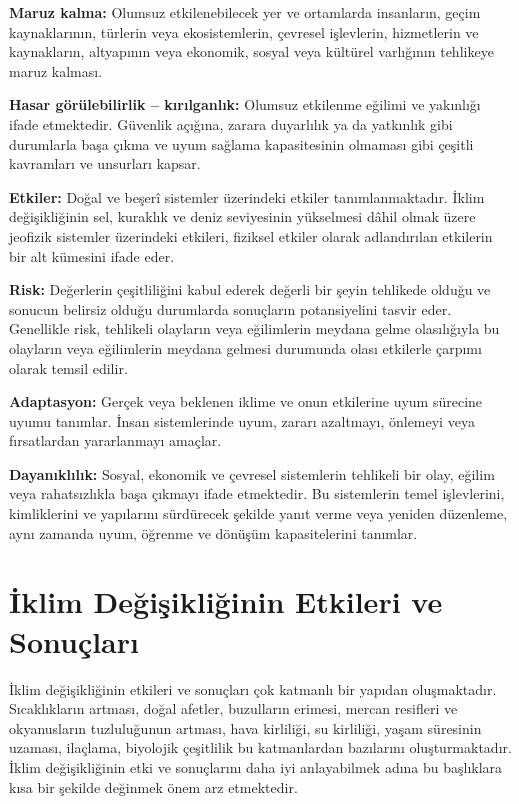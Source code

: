 \documentclass[
]{book}
\begin{document}
\textbf{Maruz kalma:} Olumsuz etkilenebilecek yer ve ortamlarda insanların, geçim kaynaklarının, türlerin veya ekosistemlerin, çevresel işlevlerin, hizmetlerin ve kaynakların, altyapının veya ekonomik, sosyal veya kültürel varlığının tehlikeye maruz kalması.

\textbf{Hasar görülebilirlik -- kırılganlık:} Olumsuz etkilenme eğilimi ve yakınlığı ifade etmektedir. Güvenlik açığına, zarara duyarlılık ya da yatkınlık gibi durumlarla başa çıkma ve uyum sağlama kapasitesinin olmaması gibi çeşitli kavramları ve unsurları kapsar.

\textbf{Etkiler:} Doğal ve beşerî sistemler üzerindeki etkiler tanımlanmaktadır. İklim değişikliğinin sel, kuraklık ve deniz seviyesinin yükselmesi dâhil olmak üzere jeofizik sistemler üzerindeki etkileri, fiziksel etkiler olarak adlandırılan etkilerin bir alt kümesini ifade eder.

\textbf{Risk:} Değerlerin çeşitliliğini kabul ederek değerli bir şeyin tehlikede olduğu ve sonucun belirsiz olduğu durumlarda sonuçların potansiyelini tasvir eder. Genellikle risk, tehlikeli olayların veya eğilimlerin meydana gelme olasılığıyla bu olayların veya eğilimlerin meydana gelmesi durumunda olası etkilerle çarpımı olarak temsil edilir.

\textbf{Adaptasyon:} Gerçek veya beklenen iklime ve onun etkilerine uyum sürecine uyumu tanımlar. İnsan sistemlerinde uyum, zararı azaltmayı, önlemeyi veya fırsatlardan yararlanmayı amaçlar.

\textbf{Dayanıklılık:} Sosyal, ekonomik ve çevresel sistemlerin tehlikeli bir olay, eğilim veya rahatsızlıkla başa çıkmayı ifade etmektedir. Bu sistemlerin temel işlevlerini, kimliklerini ve yapılarını sürdürecek şekilde yanıt verme veya yeniden düzenleme, aynı zamanda uyum, öğrenme ve dönüşüm kapasitelerini tanımlar.

\hypertarget{iklim-deux11fiux15fikliux11finin-etkileri-ve-sonuuxe7larux131}{%
\section{İklim Değişikliğinin Etkileri ve Sonuçları}\label{iklim-deux11fiux15fikliux11finin-etkileri-ve-sonuuxe7larux131}}

İklim değişikliğinin etkileri ve sonuçları çok katmanlı bir yapıdan oluşmaktadır. Sıcaklıkların artması, doğal afetler, buzulların erimesi, mercan resifleri ve okyanusların tuzluluğunun artması, hava kirliliği, su kirliliği, yaşam süresinin uzaması, ilaçlama, biyolojik çeşitlilik bu katmanlardan bazılarını oluşturmaktadır. İklim değişikliğinin etki ve sonuçlarını daha iyi anlayabilmek adına bu başlıklara kısa bir şekilde değinmek önem arz etmektedir.
\end{document}
